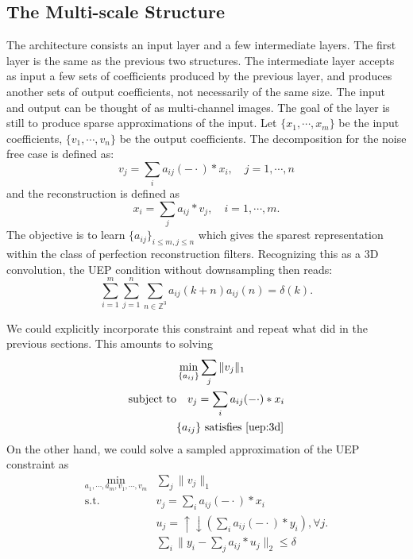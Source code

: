 \documentclass[a4paper]{article}
\begin{document}
\subsection{The Multi-scale Structure}
The architecture consists an input layer and a few intermediate layers. The first layer is the same as the previous two structures. The intermediate layer accepts as input a few sets of coefficients produced by the previous layer, and produces another sets of output coefficients, not necessarily of the same size. The input and output can be thought of as multi-channel images. The goal of the layer is still to produce sparse approximations of the input. Let $\{x_1,\cdots,x_m\}$ be the input coefficients, $\{v_1,\cdots,v_n\}$ be the output coefficients. The decomposition for the noise free case is defined as:
\begin{equation}
v_j = \sum_i a_{ij}(-\cdot)*x_i,\quad j=1,\cdots,n
\end{equation}
and the reconstruction is defined as 
\begin{equation}
x_i = \sum_j a_{ij}*v_j, \quad i=1,\cdots, m.
\end{equation}
The objective is to learn $\{a_{ij}\}_{i\leq m,j\leq n}$ which gives the sparest representation within the class of perfection reconstruction filters. Recognizing this as a 3D convolution, the UEP condition without downsampling then reads:
\begin{equation}
\label{uep:3d}
\sum_{i=1}^m\sum_{j=1}^n  \sum_{n\in \mathbb{Z}^3} a_{ij}(k+n)a_{ij}(n) = \delta(k).
\end{equation}

We could explicitly incorporate this constraint and repeat what did in the previous sections. This amounts to solving
\begin{equation}
\begin{aligned}
	&\min_{ \{a_{ij}\} } \sum_j \|v_j\|_1 \\
	\textrm{subject to} &\quad v_j = \sum_i a_{ij}(-\cdot)*x_i \\
		&\{a_{ij}\} \textrm{ satisfies \eqref{uep:3d}} \\
\end{aligned}
\end{equation}
On the other hand, we could solve a sampled approximation of the UEP constraint as
\begin{equation}
\label{eq:m3}
\begin{aligned}
\min_{a_1,\cdots,a_m, v_1,\cdots,v_m}& \sum_j \|v_j\|_1 \\
 \textrm{s.t.}  \quad &v_j = \sum_{i} a_{ij}(-\cdot)*x_i \\
	&u_j=\uparrow\downarrow(\sum_i a_{ij}(-\cdot)*y_i), \forall j. \\
	&\sum_i \|y_i - \sum_j a_{ij}*u_j\|_2 \leq \delta 
\end{aligned}
\end{equation}
\end{document}
